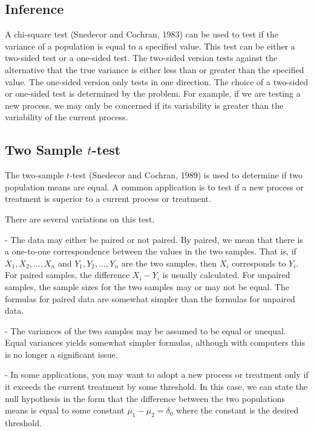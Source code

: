 \subsection{Inference}



A chi-square test (Snedecor and Cochran, 1983) can be used to test if the variance of a population is equal to a specified value. This test can be either a two-sided test or a one-sided test. The two-sided version tests against the alternative that the true variance is either less than or greater than the specified value. The one-sided version only tests in one direction. The choice of a two-sided or one-sided test is determined by the problem. For example, if we are testing a new process, we may only be concerned if its variability is greater than the variability of the current process. 


\subsection{Two Sample $t$-test}
The two-sample $t$-test (Snedecor and Cochran, 1989) is used to determine if two population means are equal. A common application is to test if a new process or treatment is superior to a current process or treatment.

There are several variations on this test.

- The data may either be paired or not paired. By paired, we mean that there is a one-to-one correspondence between the values in the two samples. That is, if $X_1, X_2, \ldots, X_n$ and $Y_1, Y_2,\ldots, Y_n$ are the two samples, then $X_i$ corresponds to $Y_i$. For paired samples, the difference $X_i-Y_i$ is usually calculated. For unpaired samples, the sample sizes for the two samples may or may not be equal. The formulas for paired data are somewhat simpler than the formulas for unpaired data.

- The variances of the two samples may be assumed to be equal or unequal. Equal variances yields somewhat simpler formulas, although with computers this is no longer a significant issue.

- In some applications, you may want to adopt a new process or treatment only if it exceeds the current treatment by some threshold. In this case, we can state the null hypothesis in the form that the difference between the two populations means is equal to some constant $\mu_1-\mu_2 =\delta_0$ where the constant is the desired threshold.



